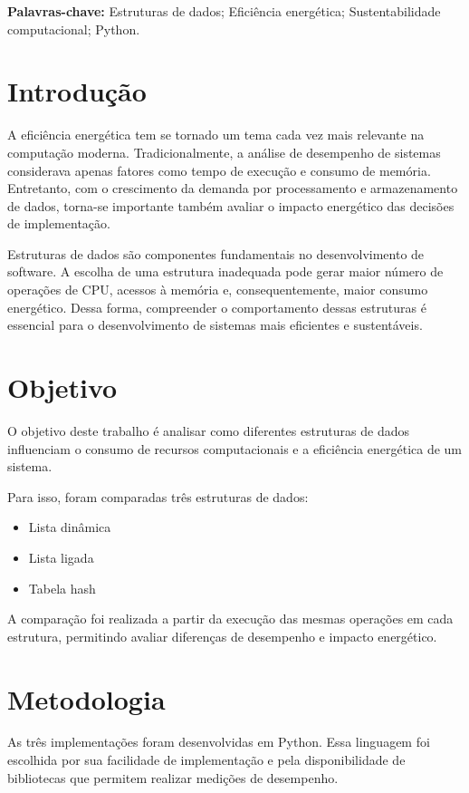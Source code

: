 \documentclass[12pt,a4paper]{article}
\begin{document}
\textbf{Palavras-chave:} Estruturas de dados; Eficiência energética; Sustentabilidade computacional; Python.

\section{Introdução}

A eficiência energética tem se tornado um tema cada vez mais relevante na computação moderna. Tradicionalmente, a análise de desempenho de sistemas considerava apenas fatores como tempo de execução e consumo de memória. Entretanto, com o crescimento da demanda por processamento e armazenamento de dados, torna-se importante também avaliar o impacto energético das decisões de implementação.

Estruturas de dados são componentes fundamentais no desenvolvimento de software. A escolha de uma estrutura inadequada pode gerar maior número de operações de CPU, acessos à memória e, consequentemente, maior consumo energético. Dessa forma, compreender o comportamento dessas estruturas é essencial para o desenvolvimento de sistemas mais eficientes e sustentáveis.

\section{Objetivo}

O objetivo deste trabalho é analisar como diferentes estruturas de dados influenciam o consumo de recursos computacionais e a eficiência energética de um sistema.

Para isso, foram comparadas três estruturas de dados:

\begin{itemize}
\item Lista dinâmica
\item Lista ligada
\item Tabela hash
\end{itemize}

A comparação foi realizada a partir da execução das mesmas operações em cada estrutura, permitindo avaliar diferenças de desempenho e impacto energético.

\section{Metodologia}

As três implementações foram desenvolvidas em Python. Essa linguagem foi escolhida por sua facilidade de implementação e pela disponibilidade de bibliotecas que permitem realizar medições de desempenho.
\end{document}
